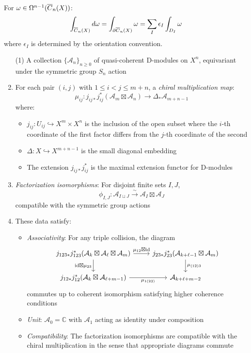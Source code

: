 \begin{theorem}
For $\omega \in \Omega^{n-1}(\overline{C}_{n}(X))$:
$$\int_{\overline{C}_{n}(X)} d\omega = \int_{\partial\overline{C}_{n}(X)} \omega = \sum_{I} \epsilon_I \int_{D_I} \omega$$
where $\epsilon_I$ is determined by the orientation convention.
\end{theorem}

\begin{enumerate}
\item[(1)] A collection $\{\mathcal{A}_n\}_{n \geq 0}$ of quasi-coherent D-modules on $X^n$, equivariant under 
the symmetric group $S_n$ action

\item For each pair $(i,j)$ with $1 \leq i < j \leq m+n$, a \emph{chiral multiplication map}:
\[
\mu_{ij}: j_{ij*}j_{ij}^* \left(\mathcal{A}_m \boxtimes \mathcal{A}_n\right) \to \Delta_{*}\mathcal{A}_{m+n-1}
\]
where:
\begin{itemize}
\item $j_{ij}: U_{ij} \hookrightarrow X^m \times X^n$ is the inclusion of the open subset where the 
$i$-th coordinate of the first factor differs from the $j$-th coordinate of the second
\item $\Delta: X \hookrightarrow X^{m+n-1}$ is the small diagonal embedding
\item The extension $j_{ij*}j_{ij}^*$ is the maximal extension functor for D-modules
\end{itemize}
 
\item \emph{Factorization isomorphisms}: For disjoint finite sets $I, J$,
\[
\phi_{I,J}: \mathcal{A}_{I \sqcup J} \xrightarrow{\sim} \mathcal{A}_I \boxtimes \mathcal{A}_J
\]
compatible with the symmetric group actions
 
\item These data satisfy:
\begin{itemize}
\item \emph{Associativity}: For any triple collision, the diagram
\[
\begin{tikzcd}
j_{123*}j_{123}^*(\mathcal{A}_k \boxtimes \mathcal{A}_\ell \boxtimes \mathcal{A}_m) 
\arrow[r, "\mu_{12} \boxtimes \text{id}"] \arrow[d, "\text{id} \boxtimes \mu_{23}"'] &
j_{23*}j_{23}^*(\mathcal{A}_{k+\ell-1} \boxtimes \mathcal{A}_m) \arrow[d, "\mu_{(12)3}"] \\
j_{12*}j_{12}^*(\mathcal{A}_k \boxtimes \mathcal{A}_{\ell+m-1}) \arrow[r, "\mu_{1(23)}"'] &
\mathcal{A}_{k+\ell+m-2}
\end{tikzcd}
\]
commutes up to coherent isomorphism satisfying higher coherence conditions
 
\item \emph{Unit}: $\mathcal{A}_0 = \mathbb{C}$ with $\mathcal{A}_1$ acting as identity under composition
 
\item \emph{Compatibility}: The factorization isomorphisms are compatible with the chiral multiplication
in the sense that appropriate diagrams commute
\end{itemize}
\end{enumerate}
 
